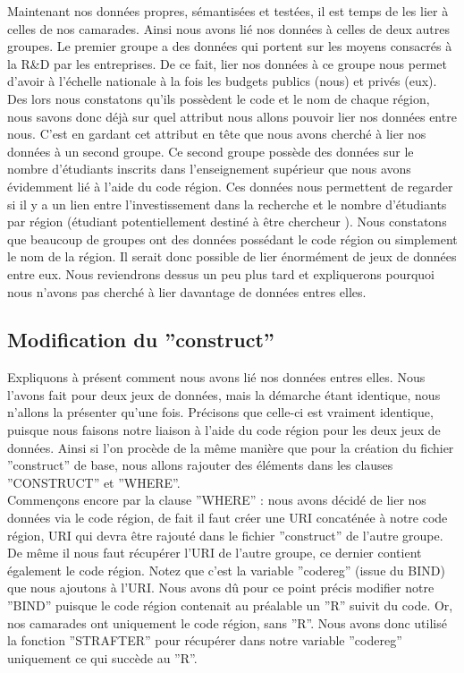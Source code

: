 \documentclass[a4paper,sffamily,12pt]{article}
\begin{document}
				Maintenant nos données propres, sémantisées et testées, il est temps de les lier à celles de nos camarades. Ainsi nous avons lié nos données à celles de deux autres groupes. Le premier groupe a des données qui portent sur les moyens consacrés à la R\&D par les entreprises. De ce fait, lier nos données à ce groupe nous permet d'avoir à l'échelle nationale à la fois les budgets publics (nous) et privés (eux). Des lors nous constatons qu'ils possèdent le code et le nom de chaque région, nous savons donc déjà sur quel attribut nous allons pouvoir lier nos données entre nous. C'est en gardant cet attribut en tête que nous avons cherché à lier nos données à un second groupe. Ce second groupe possède des données sur le nombre d'étudiants inscrits dans l'enseignement supérieur que nous avons évidemment lié à l'aide du code région. Ces données nous permettent de regarder si il y a un lien entre l'investissement dans la recherche et le nombre d'étudiants  par région (étudiant potentiellement destiné à être chercheur ). Nous constatons que beaucoup de groupes ont des données possédant le code région ou simplement le nom de la région. Il serait donc possible de lier énormément de jeux de données entre eux. Nous reviendrons dessus un peu plus tard et expliquerons pourquoi nous n'avons pas cherché à lier davantage de données entres elles. 

			\vspace{0.5cm}
			
		\subsection{Modification du ''construct''}
			
			\vspace{0.5cm}

			Expliquons à présent comment nous avons lié nos données entres elles. Nous l'avons fait pour deux jeux de données, mais la démarche étant identique, nous n'allons la présenter  qu'une fois. Précisons que celle-ci est vraiment identique, puisque nous faisons notre liaison à l'aide du code région pour les deux jeux de données. Ainsi si l'on procède de la même manière que pour la création du fichier ''construct'' de base, nous allons rajouter des éléments dans les clauses ''CONSTRUCT'' et ''WHERE''.  \\
			
			\indent Commençons encore par la clause ''WHERE'' : nous avons décidé de lier nos données via le code région, de fait il faut créer une URI concaténée à notre code région, URI qui devra être rajouté dans le fichier ''construct'' de l'autre groupe. De même il nous faut récupérer l'URI de l'autre groupe, ce dernier contient également le code région. Notez que c'est la variable ''codereg'' (issue du BIND) que nous ajoutons à l'URI. Nous avons dû pour ce point précis modifier notre ''BIND'' puisque le code région contenait au préalable un ''R'' suivit du code. Or, nos camarades ont uniquement le code région, sans ''R''. Nous avons donc utilisé la fonction ''STRAFTER'' pour récupérer dans notre variable ''codereg'' uniquement ce qui succède au ''R''. \\
			
\end{document}
